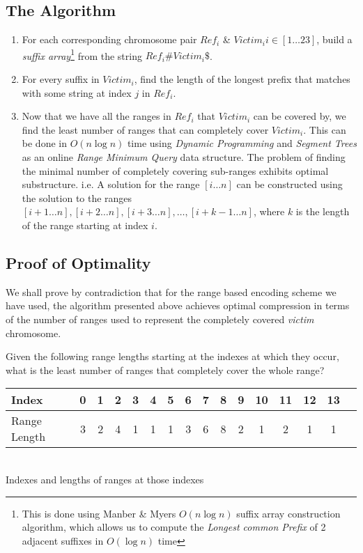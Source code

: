 \documentclass[11pt]{article}
\begin{document}
\subsection{The Algorithm}

\begin{enumerate}

\item For each corresponding chromosome pair ${Ref}_i$ \& $Victim_i i
  \in [1\ldots{}23]$, build a
  \textit{suffix array}\footnote{This is done using Manber \& Myers
    $O(n\log{n})$ suffix array construction
    algorithm\cite{manbermyers}, which allows us to compute the
    \textit{Longest common Prefix} of 2 adjacent suffixes in
    $O(\log{n})$ time} from the string $Ref_i\#Victim_i\$$.

\item For every suffix in ${Victim}_i$, find the length of the longest
  prefix that matches with some string at index $j$ in ${Ref}_i$.

\item Now that we have all the ranges in $Ref_i$ that $Victim_i$ can
  be covered by, we find the least number of ranges that can
  completely cover $Victim_i$. This can be done in $O(n\log{n})$ time
  using \textit{Dynamic Programming} and \textit{Segment Trees} as an
  online \textit{Range Minimum Query} data structure. The problem of
  finding the minimal number of completely covering sub-ranges
  exhibits optimal substructure. i.e. A solution for the range
  $[i\ldots{}n]$ can be constructed using the solution to the ranges
  $[i+1\ldots{}n], [i+2\ldots{}n], [i+3\ldots{}n], \ldots{},
  [i+k-1\ldots{}n]$, where $k$ is the length of the range starting at
  index $i$.

\end{enumerate}

\subsection{Proof of Optimality}

We shall prove by contradiction that for the range based encoding
scheme we have used, the algorithm presented above achieves optimal
compression in terms of the number of ranges used to represent the
completely covered \textit{victim} chromosome.

Given the following range lengths starting at the indexes at which
they occur, what is the least number of ranges that completely cover
the whole range?

\begin{center}
  \begin{tabular}{|l|c|c|c|c|c|c|c|c|c|c|c|c|c|c|c|}
    \hline
    Index        & 0 & 1 & 2 & 3 & 4 & 5 & 6 & 7 & 8 & 9 &10 &11 &12 &13\\
    \hline
    Range Length & 3 & 2 & 4 & 1 & 1 & 1 & 3 & 6 & 8 & 2 & 1 & 2 & 1 & 1\\
    \hline
  \end{tabular}\\
  \vspace{0.3cm}
  Indexes and lengths of ranges at those indexes
\end{center}
\end{document}
